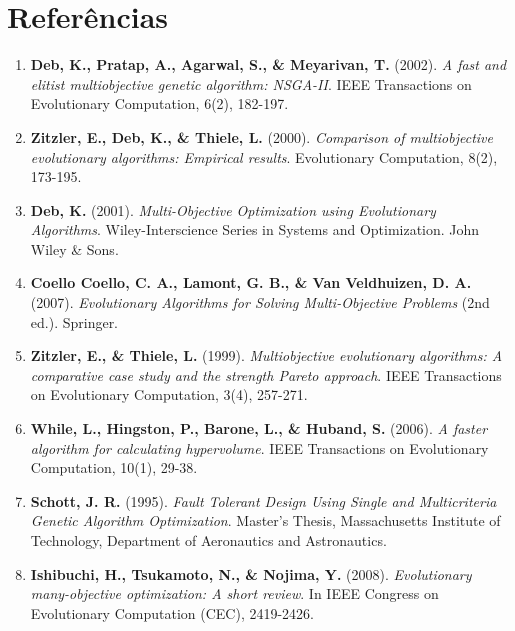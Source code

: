 
\section{Referências}

\begin{enumerate}
    \item \textbf{Deb, K., Pratap, A., Agarwal, S., \& Meyarivan, T.} (2002). \textit{A fast and elitist multiobjective genetic algorithm: NSGA-II}. IEEE Transactions on Evolutionary Computation, 6(2), 182-197.
    
    \item \textbf{Zitzler, E., Deb, K., \& Thiele, L.} (2000). \textit{Comparison of multiobjective evolutionary algorithms: Empirical results}. Evolutionary Computation, 8(2), 173-195.
    
    \item \textbf{Deb, K.} (2001). \textit{Multi-Objective Optimization using Evolutionary Algorithms}. Wiley-Interscience Series in Systems and Optimization. John Wiley \& Sons.
    
    \item \textbf{Coello Coello, C. A., Lamont, G. B., \& Van Veldhuizen, D. A.} (2007). \textit{Evolutionary Algorithms for Solving Multi-Objective Problems} (2nd ed.). Springer.
    
    \item \textbf{Zitzler, E., \& Thiele, L.} (1999). \textit{Multiobjective evolutionary algorithms: A comparative case study and the strength Pareto approach}. IEEE Transactions on Evolutionary Computation, 3(4), 257-271.
    
    \item \textbf{While, L., Hingston, P., Barone, L., \& Huband, S.} (2006). \textit{A faster algorithm for calculating hypervolume}. IEEE Transactions on Evolutionary Computation, 10(1), 29-38.
    
    \item \textbf{Schott, J. R.} (1995). \textit{Fault Tolerant Design Using Single and Multicriteria Genetic Algorithm Optimization}. Master's Thesis, Massachusetts Institute of Technology, Department of Aeronautics and Astronautics.
    
    \item \textbf{Ishibuchi, H., Tsukamoto, N., \& Nojima, Y.} (2008). \textit{Evolutionary many-objective optimization: A short review}. In IEEE Congress on Evolutionary Computation (CEC), 2419-2426.
    

\end{enumerate}
